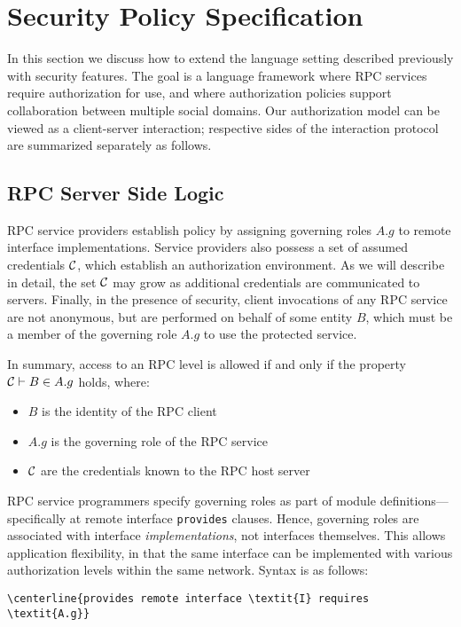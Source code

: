 \section{Security Policy Specification}
\label{section-security-extensions}

In this section we discuss how to extend the language setting described previously with security
features. The goal is a language framework where RPC services require authorization for use, and
where authorization policies support collaboration between multiple social domains. Our
authorization model can be viewed as a client-server interaction; respective sides of the
interaction protocol are summarized separately as follows.

\subsection{RPC Server Side Logic}
\label{section-rpc-server-side}

RPC service providers establish policy by assigning governing roles $A.g$ to remote interface
implementations. Service providers also possess a set of assumed credentials $\mathcal{C}$, which
establish an authorization environment. As we will describe in detail, the set $\mathcal{C}$ may grow
as additional credentials are communicated to servers. Finally, in the presence of security,
client invocations of any RPC service are not anonymous, but are performed on behalf of some
entity $B$, which must be a member of the governing role $A.g$ to use the protected service.

In summary, access to an RPC level is allowed if and only if the property $\mathcal{C} \vdash B \in
A.g$ holds, where:
\begin{itemize}
  \item $B$ is the identity of the RPC client
  \item $A.g$ is the governing role of the RPC service
  \item $\mathcal{C}$ are the credentials known to the RPC host server
\end{itemize}
RPC service programmers specify governing roles as part of module definitions---specifically at
remote interface \texttt{provides} clauses. Hence, governing roles are associated with interface
\emph{implementations}, not interfaces themselves. This allows application flexibility, in that
the same interface can be implemented with various authorization levels within the same network.
Syntax is as follows:
\begin{Verbatim}[commandchars=\\\{\}]
\centerline{provides remote interface \textit{I} requires \textit{A.g}}
\end{Verbatim}

